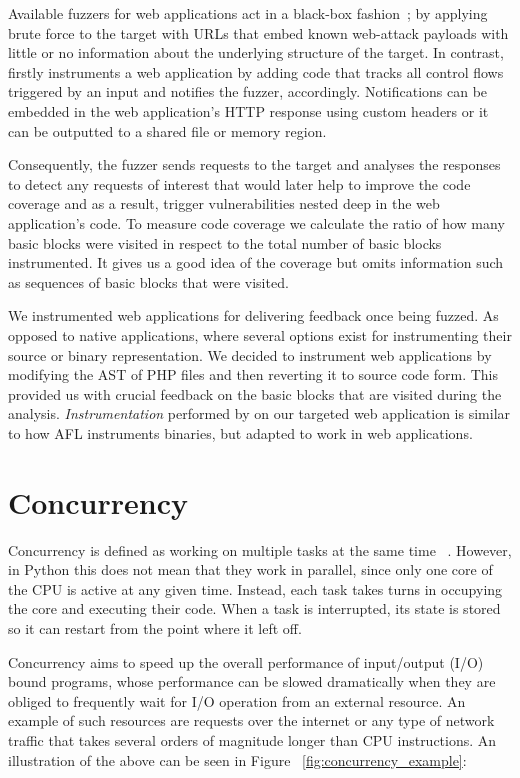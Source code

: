 Available fuzzers for web applications act in a black-box fashion~\cite{doupe2010johnny}; by applying brute force to the target with URLs that embed known web-attack payloads with little or no information about the underlying structure of the target. In contrast, \pname firstly instruments a web application by adding code that tracks all control flows triggered by an input and notifies the fuzzer, accordingly. Notifications can be embedded in the web application's HTTP response using custom headers or it can be outputted to a shared file or memory region. 

Consequently, the fuzzer sends requests to the target and analyses the responses to detect any requests of interest that would later help to improve the code coverage and as a result, trigger vulnerabilities nested deep in the web application's code. To measure code coverage we calculate the ratio of how many basic blocks were visited in respect to the total number of basic blocks instrumented. It gives us a good idea of the coverage but omits information such as sequences of basic blocks that were visited.

We instrumented web applications for delivering feedback once being fuzzed. As opposed to native applications, where several options exist for instrumenting their source or binary representation. We decided to instrument web applications by modifying the AST of PHP files and then reverting it to source code form. This provided us with crucial feedback on the basic blocks that are visited during the analysis. \emph{Instrumentation} performed by \pname on our targeted web application is similar to how AFL instruments binaries, but adapted to work in web applications.

\section{Concurrency}
Concurrency is defined as working on multiple tasks at the same time ~\cite{concurrency_realpython}. However, in Python this does not mean that they work in parallel, since only one core of the CPU is active at any given time. Instead, each task takes turns in occupying the core and executing their code. When a task is interrupted, its state is stored so it can restart from the point where it left off. 

Concurrency aims to speed up the overall performance of input/output (I/O) bound programs, whose performance can be slowed dramatically when they are obliged to frequently wait for I/O operation from an external resource. An example of such resources are requests over the internet or any type of network traffic that takes several orders of magnitude longer than CPU instructions. An illustration of the above can be seen in Figure ~\ref{fig:concurrency_example}:


